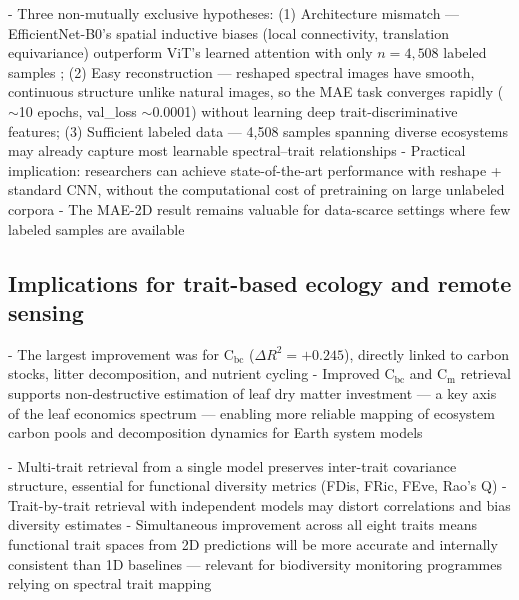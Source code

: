  - Three non-mutually exclusive hypotheses:
   (1) Architecture mismatch --- EfficientNet-B0's spatial
   inductive biases (local connectivity, translation
   equivariance) outperform ViT's learned attention with
   only $n = 4{,}508$ labeled samples
   \citep{dosovitskiy2021vit};
   (2) Easy reconstruction --- reshaped spectral images
   have smooth, continuous structure unlike natural images,
   so the MAE task converges rapidly ($\sim$10 epochs,
   val\_loss $\sim$0.0001) without learning deep
   trait-discriminative features;
   (3) Sufficient labeled data --- 4,508 samples spanning
   diverse ecosystems may already capture most learnable
   spectral--trait relationships
 - Practical implication: researchers can achieve
   state-of-the-art performance with reshape + standard
   CNN, without the computational cost of pretraining on
   large unlabeled corpora
 - The MAE-2D result remains valuable for data-scarce
   settings where few labeled samples are available


\subsection{Implications for trait-based ecology and remote sensing}
\label{sec:disc_implications}

 - The largest improvement was for C$_\text{bc}$
   ($\Delta R^2 = +0.245$), directly linked to carbon
   stocks, litter decomposition, and nutrient cycling
   \citep{kattge2020try}
 - Improved C$_\text{bc}$ and C$_\text{m}$ retrieval
   supports non-destructive estimation of leaf dry
   matter investment --- a key axis of the leaf economics
   spectrum \citep{wright2004les} --- enabling more
   reliable mapping of ecosystem carbon pools and
   decomposition dynamics for Earth system models
   \citep{homolova2013review}

 - Multi-trait retrieval from a single model preserves
   inter-trait covariance structure, essential for
   functional diversity metrics (FDis, FRic, FEve, Rao's
   Q) \citep{villeger2008fd, laliberte2010fdis}
 - Trait-by-trait retrieval with independent models may
   distort correlations and bias diversity estimates
 - Simultaneous improvement across all eight traits means
   functional trait spaces from 2D predictions will be
   more accurate and internally consistent than 1D
   baselines --- relevant for biodiversity monitoring
   programmes relying on spectral trait mapping
   \citep{schweiger2018plant, binh2025mangrove, weiss2020remote}

